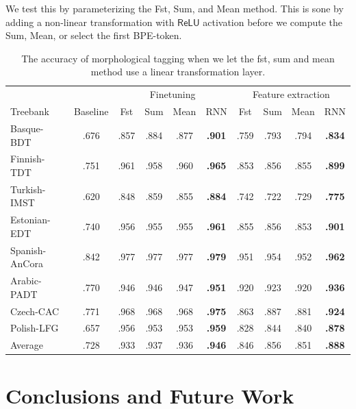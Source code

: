 \documentclass[11pt]{article}
\begin{document}
            We test this by parameterizing the Fst, Sum, and Mean
     method. This is sone by adding a non-linear transformation with
     $\mathsf{ReLU}$ activation before we compute the Sum, Mean, or
     select the first BPE-token.


        \begin{table}%
	\centering
	\begin{tabular}{l|c|cccc|cccc}
		& & \multicolumn{4}{c}{Finetuning} & \multicolumn{4}{c}{Feature extraction} \\
		Treebank & Baseline & Fst & Sum & Mean & RNN & Fst & Sum & Mean & RNN \\
		\hline
		Basque-BDT      & .676 & .857 & .884 & .877 & \textbf{.901} & .759 & .793 & .794 & \textbf{.834} \\
		Finnish-TDT     & .751 & .961 & .958 & .960 & \textbf{.965} & .853 & .856 & .855 & \textbf{.899} \\
		Turkish-IMST    & .620 & .848 & .859 & .855 & \textbf{.884} & .742 & .722 & .729 & \textbf{.775} \\
		Estonian-EDT    & .740 & .956 & .955 & .955 & \textbf{.961} & .855 & .856 & .853 & \textbf{.901} \\
		Spanish-AnCora  & .842 & .977 & .977 & .977 & \textbf{.979} & .951 & .954 & .952 & \textbf{.962} \\
		Arabic-PADT     & .770 & .946 & .946 & .947 & \textbf{.951} & .920 & .923 & .920 & \textbf{.936} \\
		Czech-CAC       & .771 & .968 & .968 & .968 & \textbf{.975} & .863 & .887 & .881 & \textbf{.924} \\
		Polish-LFG      & .657 & .956 & .953 & .953 & \textbf{.959} & .828 & .844 & .840 & \textbf{.878} \\
        \hline
        Average         & .728 & .933 & .937 & .936 & \textbf{.946} & .846 & .856 & .851 & \textbf{.888} \\
	\end{tabular}
    	\caption{\label{tab:parameters} The accuracy of morphological tagging when we let the fst, sum and mean method use a linear transformation layer.}
    
    \end{table}

    \section{Conclusions and Future Work}


    
\end{document}
